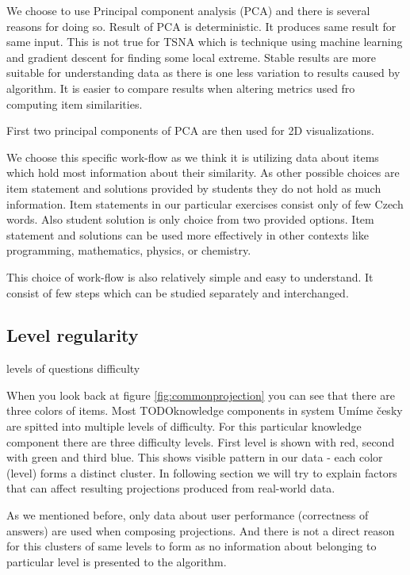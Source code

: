 \documentclass[
  digital, %
  table,   %
  nolof,     %
  nolot,     %
  nocover
]{fithesis3}
\begin{document}
We choose to use Principal component analysis (PCA) and there is several
reasons for doing so. Result of PCA is deterministic. It produces same
result for same input. This is not true for TSNA which is technique
using machine learning and gradient descent for finding some local
extreme. Stable results are more suitable for understanding data as
there is one less variation to results caused by algorithm. It is easier
to compare results when altering metrics used fro computing item
similarities.

First two principal components of PCA are then used for 2D
visualizations.


We choose this specific work-flow as we think it is utilizing data about
items which hold most information about their similarity. As other
possible choices are item statement and solutions provided by students
they do not hold as much information. Item statements in our particular
exercises consist only of few Czech words. Also student solution is only
choice from two provided options. Item statement and solutions can be
used more effectively in other contexts like programming, mathematics,
physics, or chemistry.

This choice of work-flow is also relatively simple and easy to
understand. It consist of few steps which can be studied separately and
interchanged.

\subsection{Level regularity}\label{level-regularity}

levels of questions difficulty

When you look back at figure \ref{fig:commonprojection} you can see that
there are three colors of items. Most TODOknowledge components in system
Umíme česky are spitted into multiple levels of difficulty. For this
particular knowledge component there are three difficulty levels. First
level is shown with red, second with green and third blue. This shows
visible pattern in our data - each color (level) forms a distinct
cluster. In following section we will try to explain factors that can
affect resulting projections produced from real-world data.

As we mentioned before, only data about user performance (correctness of
answers) are used when composing projections. And there is not a direct
reason for this clusters of same levels to form as no information about
belonging to particular level is presented to the algorithm.
\end{document}
